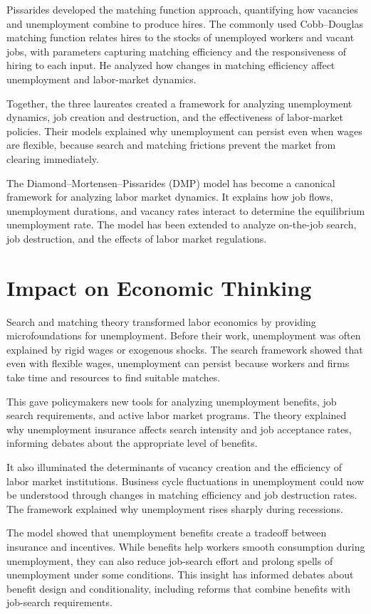 Pissarides developed the matching function approach, quantifying how vacancies
and unemployment combine to produce hires. The commonly used Cobb--Douglas
matching function relates hires to the stocks of unemployed workers and vacant
jobs, with parameters capturing matching efficiency and the responsiveness of
hiring to each input. He analyzed how changes in matching efficiency affect
unemployment and labor-market dynamics.

Together, the three laureates created a framework for analyzing unemployment
dynamics, job creation and destruction, and the effectiveness of labor-market
policies. Their models explained why unemployment can persist even when wages
are flexible, because search and matching frictions prevent the market from
clearing immediately.

The Diamond--Mortensen--Pissarides (DMP) model has become a canonical framework
for analyzing labor market dynamics. It explains how job flows, unemployment
durations, and vacancy rates interact to determine the equilibrium unemployment
rate. The model has been extended to analyze on-the-job search, job destruction,
and the effects of labor market regulations.

\section{Impact on Economic Thinking}
Search and matching theory transformed labor economics by providing microfoundations
for unemployment. Before their work, unemployment was often explained by rigid
wages or exogenous shocks. The search framework showed that even with flexible
wages, unemployment can persist because workers and firms take time and resources
to find suitable matches.

This gave policymakers new tools for analyzing unemployment benefits, job search
requirements, and active labor market programs. The theory explained why
unemployment insurance affects search intensity and job acceptance rates,
informing debates about the appropriate level of benefits.

It also illuminated the determinants of vacancy creation and the efficiency of
labor market institutions. Business cycle fluctuations in unemployment could now
be understood through changes in matching efficiency and job destruction rates.
The framework explained why unemployment rises sharply during recessions.

The model showed that unemployment benefits create a tradeoff between insurance
and incentives. While benefits help workers smooth consumption during
unemployment, they can also reduce job-search effort and prolong spells of
unemployment under some conditions. This insight has informed debates about
benefit design and conditionality, including reforms that combine benefits with
job-search requirements.

